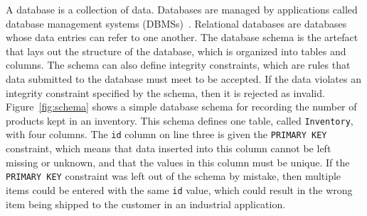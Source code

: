 A database is a collection of data. Databases are managed by applications called database management systems
(DBMSs)~\cite{databasebook}.  Relational databases are databases whose data entries can refer to one another. The
database schema is the artefact that lays out the structure of the database, which is organized into tables and columns.
The schema can also define integrity constraints, which are rules that data submitted to the database must meet to be
accepted. If the data violates an integrity constraint specified by the schema, then it is rejected as invalid.
Figure~\ref{fig:schema} shows a simple database schema for recording the number of products kept in an inventory. This
schema defines one table, called \texttt{Inventory}, with four columns.  The \texttt{id} column on line three is given
the \texttt{PRIMARY KEY} constraint, which means that data inserted into this column cannot be left missing or unknown,
and that the values in this column must be unique. If the \texttt{PRIMARY KEY} constraint was left out of the schema by
mistake, then multiple items could be entered with the same \texttt{id} value, which could result in the wrong item
being shipped to the customer in an industrial application.
